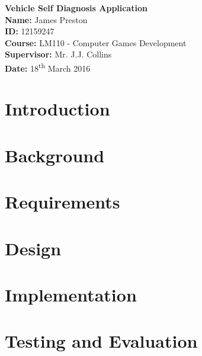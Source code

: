 \documentclass[12pt]{report}
\begin{document}
\begin{titlepage}
	\begin{center}		
		\vspace*{5cm}
		\textbf{\LARGE{Vehicle Self Diagnosis Application}}\\
		\vspace{6cm}
		\large{		
		\textbf{Name:} James Preston\\
		\textbf{ID:} 12159247\\
		\textbf{Course:} LM110 - Computer Games Development\\
		\textbf{Supervisor:} Mr. J.J. Collins\\
		\textbf{Date:} 18\textsuperscript{th} March 2016 \\
		}
	\end{center}
\end{titlepage}

	\tableofcontents
	\newpage
	
	\chapter{Introduction}
		
	\newpage 
	
	\chapter{Background}
		
	\newpage

	\chapter{Requirements}
		
	\newpage	

	\chapter{Design}
		
	\newpage
	
	\chapter{Implementation}
		
	\newpage

	\chapter{Testing and Evaluation}
		
	\newpage
	
\end{document}
